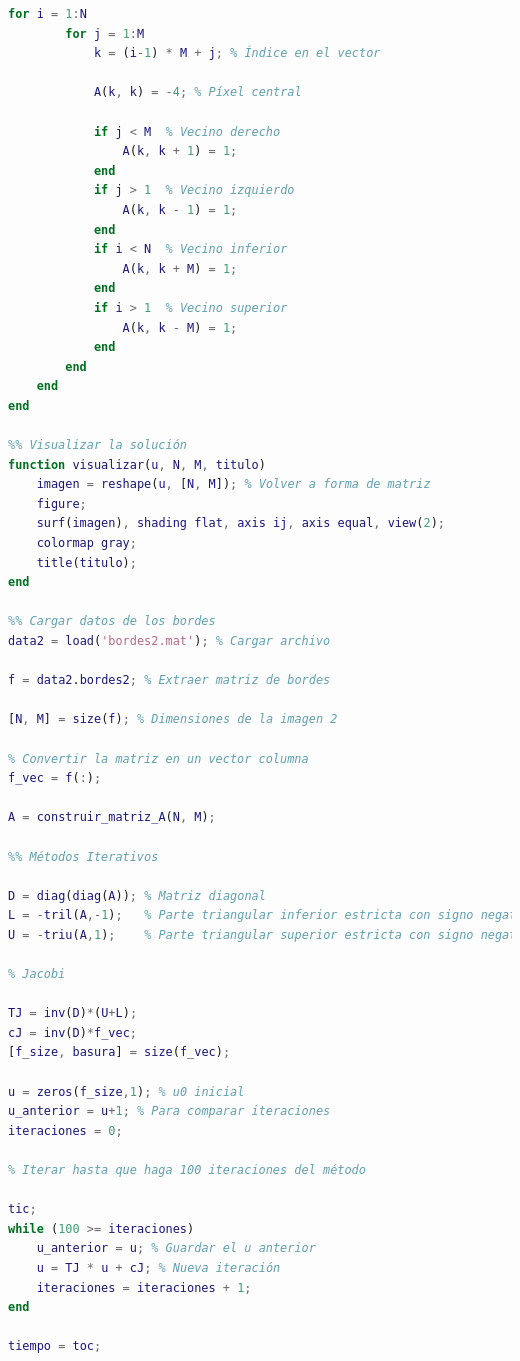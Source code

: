 \begin{homeworkProblem}
\begin{solucion}
\begin{enumerate}
\begin{lstlisting}[language = matlab]
    for i = 1:N
        for j = 1:M
            k = (i-1) * M + j; % Índice en el vector

            A(k, k) = -4; % Píxel central

            if j < M  % Vecino derecho
                A(k, k + 1) = 1;
            end
            if j > 1  % Vecino izquierdo
                A(k, k - 1) = 1;
            end
            if i < N  % Vecino inferior
                A(k, k + M) = 1;
            end
            if i > 1  % Vecino superior
                A(k, k - M) = 1;
            end
        end
    end
end

%% Visualizar la solución
function visualizar(u, N, M, titulo)
    imagen = reshape(u, [N, M]); % Volver a forma de matriz
    figure;
    surf(imagen), shading flat, axis ij, axis equal, view(2);
    colormap gray;
    title(titulo);
end

%% Cargar datos de los bordes
data2 = load('bordes2.mat'); % Cargar archivo

f = data2.bordes2; % Extraer matriz de bordes

[N, M] = size(f); % Dimensiones de la imagen 2

% Convertir la matriz en un vector columna
f_vec = f(:);

A = construir_matriz_A(N, M);

%% Métodos Iterativos

D = diag(diag(A)); % Matriz diagonal
L = -tril(A,-1);   % Parte triangular inferior estricta con signo negativo
U = -triu(A,1);    % Parte triangular superior estricta con signo negativo

% Jacobi

TJ = inv(D)*(U+L);
cJ = inv(D)*f_vec;
[f_size, basura] = size(f_vec);

u = zeros(f_size,1); % u0 inicial
u_anterior = u+1; % Para comparar iteraciones
iteraciones = 0;

% Iterar hasta que haga 100 iteraciones del método

tic;
while (100 >= iteraciones)
    u_anterior = u; % Guardar el u anterior
    u = TJ * u + cJ; % Nueva iteración
    iteraciones = iteraciones + 1;
end

tiempo = toc;


\end{lstlisting}
\end{enumerate}
\end{solucion}
\end{homeworkProblem}

